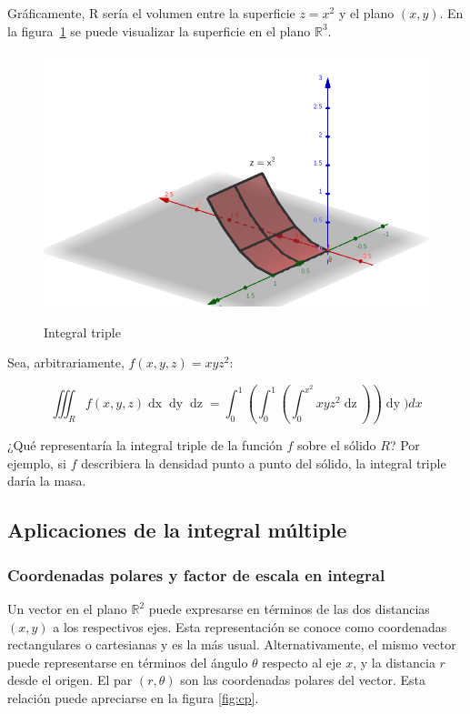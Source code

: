 \documentclass{article}
\renewcommand{\Bbb}{\mathbb}
\begin{document}
Gráficamente, R sería el volumen entre la superficie $z = x^2$ y el plano $(x, y)$. En la figura~\ref{fig:itv} se puede visualizar la superficie en el plano $\Bbb R^3$.

\begin{figure}[ht]
\centering
\caption{Integral triple}
\includegraphics[scale=0.6]{img/teo_fig028_itv.png}
\label{fig:itv}
\end{figure}

Sea, arbitrariamente, $f(x,y,z) = xyz^2$:

\begin{equation}
\iiint_R f(x,y,z) \mathop{dx} \mathop{dy} \mathop{dz} = \int_0^1 \left( \int_0^1 \left( \int_0^{x^2} xyz^2 \mathop{dz} \right)  \right) \mathop{dy}) dx
\end{equation}

¿Qué representaría la integral triple de la función $f$ sobre el sólido $R$? Por ejemplo, si $f$ describiera la densidad punto a punto del sólido, la integral triple daría la masa.

\subsection{Aplicaciones de la integral múltiple}

\subsubsection{Coordenadas polares y factor de escala en integral}

Un vector en el plano $\Bbb R^2$ puede expresarse en términos de las dos distancias $(x,y)$ a los respectivos ejes. Esta representación se conoce como coordenadas rectangulares o cartesianas y es la más usual. Alternativamente, el mismo vector puede representarse en términos del ángulo $\theta$ respecto al eje $x$, y la distancia $r$ desde el origen. El par $(r, \theta)$ son las coordenadas polares del vector. Esta relación puede apreciarse en la figura \ref{fig:cp}.
\end{document}
